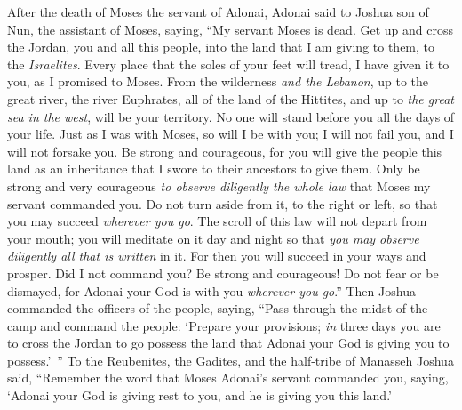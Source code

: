 
\begin{biblechapter} %
 After the death of Moses the servant of Adonai, Adonai said to Joshua son of Nun, the assistant of Moses, saying,
\verse “My servant Moses is dead. Get up and cross the Jordan, you and all this people, into the land that I am giving to them, to the \textit{Israelites}.
\verse Every place that the soles of your feet will tread, I have given it to you, as I promised to Moses.
\verse From the wilderness \textit{and the Lebanon}, up to the great river, the river Euphrates, all of the land of the Hittites, and up to \textit{the great sea in the west}, will be your territory.
\verse No one will stand before you all the days of your life. Just as I was with Moses, so will I be with you; I will not fail you, and I will not forsake you.
\verse Be strong and courageous, for you will give the people this land as an inheritance that I swore to their ancestors to give them.
\verse Only be strong and very courageous \textit{to observe diligently the whole law} that Moses my servant commanded you. Do not turn aside from it, to the right or left, so that you may succeed \textit{wherever you go}.
\verse The scroll of this law will not depart from your mouth; you will meditate on it day and night so that \textit{you may observe diligently all that is written} in it. For then you will succeed in your ways and prosper.
\verse Did I not command you? Be strong and courageous! Do not fear or be dismayed, for Adonai your God is with you \textit{wherever you go}.”
\verse Then Joshua commanded the officers of the people, saying,
\verse “Pass through the midst of the camp and command the people: ‘Prepare your provisions; \textit{in} three days you are to cross the Jordan to go possess the land that Adonai your God is giving you to possess.’ ”
\verse To the Reubenites, the Gadites, and the half-tribe of Manasseh Joshua said,
\verse “Remember the word that Moses Adonai’s servant commanded you, saying, ‘Adonai your God is giving rest to you, and he is giving you this land.’

\end{biblechapter}
